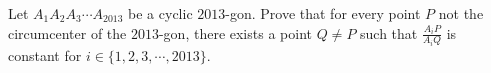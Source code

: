 Let $A_1A_2A_3 \cdots A_{2013}$ be a cyclic $2013$-gon. Prove that for every point $P$ not the circumcenter of the $2013$-gon, there exists a point $Q\neq P$ such that $\frac{A_iP}{A_iQ}$ is constant for $i \in \{1, 2, 3, \cdots, 2013\}$.

